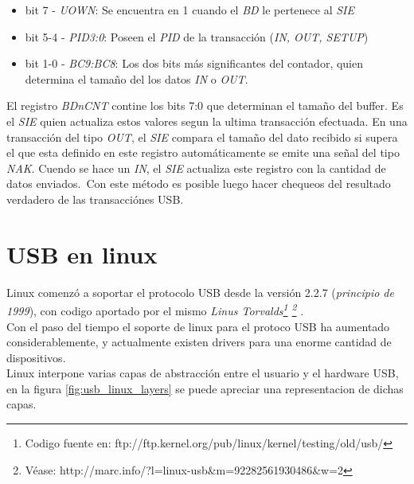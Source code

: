 \begin{itemize}
 \item bit 7 - \emph{UOWN}: Se encuentra en 1 cuando el \emph{BD} le pertenece
al \emph{SIE}

 \item bit 5-4 - \emph{PID3:0}: Poseen el \emph{PID} de la transacci\'on
(\emph{IN, OUT, SETUP})

 \item bit 1-0 - \emph{BC9:BC8}: Los dos bits m\'as significantes del
contador, quien determina el tama\~no del los datos \emph{IN} o \emph{OUT}.
\end{itemize}

El registro \emph{BDnCNT} contine los bits 7:0 que determinan el tama\~no del
buffer. Es el \emph{SIE} quien actualiza estos valores segun la ultima
transacci\'on efectuada. En una transacci\'on del tipo \emph{OUT}, el
\emph{SIE} compara el tama\~no del dato recibido si supera el que esta
definido en este registro autom\'aticamente se emite una se\~nal del tipo
\emph{NAK}. Cuendo se hace un \emph{IN}, el \emph{SIE} actualiza este registro
con la cantidad de datos enviados.\
Con este m\'etodo es posible luego hacer chequeos del resultado verdadero de
las transacci\'ones USB. 






\clearpage
\section{USB en linux}

Linux comenz\'o a soportar el protocolo USB desde la versi\'on 2.2.7
(\emph{principio de 1999}), con codigo aportado por el mismo \emph{Linus
Torvalds\footnote{Codigo fuente
en: ftp://ftp.kernel.org/pub/linux/kernel/testing/old/usb/}
\footnote{V\'ease:
http://marc.info/?l=linux-usb\&m=92282561930486\&w=2}
}.\\

Con el paso del tiempo el soporte de linux para el protoco USB ha aumentado
considerablemente, y actualmente existen drivers para una enorme cantidad de
dispositivos.\\

Linux interpone varias capas de abstracci\'on entre el usuario y el hardware
USB, en la figura \ref{fig:usb_linux_layers} se puede apreciar una
representacion de dichas capas.

